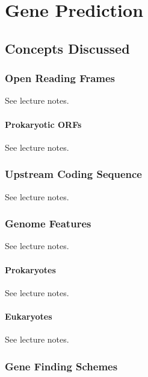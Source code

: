 
\chapter{Gene Prediction} 

\label{Chapter6} 

\section{Concepts Discussed}

    \subsection{Open Reading Frames}

    See lecture notes.\autocite{T6}

        \subsubsection{Prokaryotic ORFs}

        See lecture notes.\autocite{T6}

    \subsection{Upstream Coding Sequence}

    See lecture notes.\autocite{T6}

    \subsection{Genome Features}

    See lecture notes.\autocite{T6}

        \subsubsection{Prokaryotes}

        See lecture notes.\autocite{T6}

        \subsubsection{Eukaryotes}

        See lecture notes.\autocite{T6}

    \subsection{Gene Finding Schemes}
    

